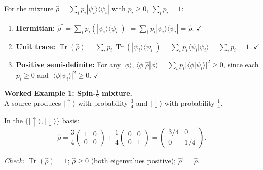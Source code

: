 \documentclass[11pt,a4paper]{article}
\begin{document}
  

\medskip\noindent
For the mixture $\hat{\rho}=\sum_i p_i|\psi_i\rangle\langle\psi_i|$
with $p_i\ge 0$, $\sum_i p_i=1$:

\begin{enumerate}[leftmargin=2em]
  \item \textbf{Hermitian:}
    $\hat{\rho}^\dagger=\sum_i p_i(|\psi_i\rangle\langle\psi_i|)^\dagger
     =\sum_i p_i|\psi_i\rangle\langle\psi_i|=\hat{\rho}$.
    \hfill$\checkmark$

  \item \textbf{Unit trace:}
    $\operatorname{Tr}(\hat{\rho})=\sum_i p_i\,\operatorname{Tr}(|\psi_i\rangle\langle\psi_i|)
     =\sum_i p_i\langle\psi_i|\psi_i\rangle=\sum_i p_i=1$.
    \hfill$\checkmark$

  \item \textbf{Positive semi-definite:}
    For any $|\phi\rangle$,
    $\langle\phi|\hat{\rho}|\phi\rangle
     =\sum_i p_i|\langle\phi|\psi_i\rangle|^2\ge 0$,
    since each $p_i\ge 0$ and $|\langle\phi|\psi_i\rangle|^2\ge 0$.
    \hfill$\checkmark$
\end{enumerate}

\begin{tcolorbox}[goldbox]
\textbf{Worked Example 1: Spin-$\tfrac{1}{2}$ mixture.}\\
A source produces $|\uparrow\rangle$ with probability $\tfrac{3}{4}$ and
$|\downarrow\rangle$ with probability $\tfrac{1}{4}$.

\medskip
In the $\{|\uparrow\rangle,|\downarrow\rangle\}$ basis:
\begin{equation}
\hat{\rho}=\frac{3}{4}\begin{pmatrix}1&0\\0&0\end{pmatrix}
+\frac{1}{4}\begin{pmatrix}0&0\\0&1\end{pmatrix}
=\begin{pmatrix}3/4&0\\0&1/4\end{pmatrix}.
\label{eq:L01.1}
\end{equation}

\textit{Check:} $\operatorname{Tr}(\hat{\rho})=1$\checkmark;\quad
$\hat{\rho}\ge 0$ (both eigenvalues positive)\checkmark;\quad
$\hat{\rho}^\dagger=\hat{\rho}$\checkmark.
\end{tcolorbox}
\end{document}

